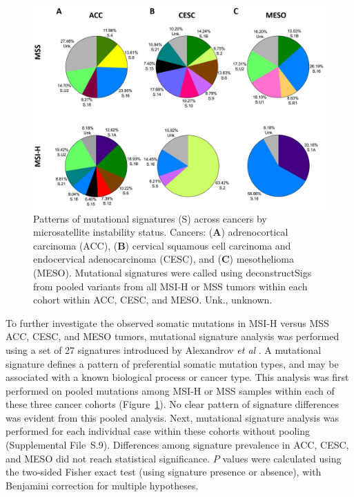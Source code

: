 \begin{figure}[htp]
    \centering
    \includegraphics[width=0.98\linewidth,keepaspectratio]{images/msilandscape/sigs_acc_cesc_meso}
    \caption[Patterns of mutational signatures across cancers by microsatellite instability status.]{Patterns of mutational signatures (S) across cancers by microsatellite instability status. Cancers: (\textbf{A}) adrenocortical carcinoma (ACC), (\textbf{B}) cervical squamous cell carcinoma and endocervical adenocarcinoma (CESC), and (\textbf{C}) mesothelioma (MESO)\@. Mutational signatures were called using deconstructSigs from pooled variants from all MSI-H or MSS tumors within each cohort within ACC, CESC, and MESO\@. Unk., unknown.}
    \label{fig:msilandscape:sigs_acc_cesc_meso}
\end{figure}
To further investigate the observed somatic mutations in MSI-H versus MSS ACC, CESC, and MESO tumors, mutational signature analysis was performed using a set of 27 signatures introduced by Alexandrov \textit{et al} \cite{alexandrov2013}. A mutational signature defines a pattern of preferential somatic mutation types, and may be associated with a known biological process or cancer type. This analysis was first performed on pooled mutations among MSI-H or MSS samples within each of these three cancer cohorts (Figure~\ref{fig:msilandscape:sigs_acc_cesc_meso}). No clear pattern of signature differences was evident from this pooled analysis. Next, mutational signature analysis was performed for each individual case within these cohorts without pooling (Supplemental File~S\thechapter{}.9). Differences among signature prevalence in ACC, CESC, and MESO did not reach statistical significance. $P$ values were calculated using the two-sided Fisher exact test (using signature presence or absence), with Benjamini correction for multiple hypotheses.

